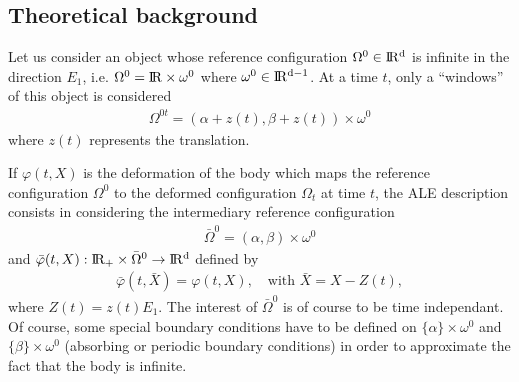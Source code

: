 \documentclass[a4paper,11pt,english]{sphinxmanual}
\begin{document}
\subsection{Theoretical background}
\label{\detokenize{userdoc/model_ALE_rotating:id3}}
Let us consider an object whose reference configuration \(\Omega^0 \in \rm I\hspace{-0.15em}R^{d}\) is infinite in the direction \(E_1\), i.e. \(\Omega^0 = \rm I\hspace{-0.15em}R \times \omega^0\) where \(\omega^0 \in \rm I\hspace{-0.15em}R^{d-1}\). At a time \(t\), only a “windows” of this object is considered
\begin{equation*}
\begin{split}\Omega^{0t} = (\alpha + z(t), \beta + z(t)) \times \omega^0\end{split}
\end{equation*}
where \(z(t)\) represents the translation.

If \(\varphi(t, X)\) is the deformation of the body which maps the reference configuration \(\Omega^0\) to the deformed configuration \(\Omega_t\) at time \(t\), the ALE description consists in considering the intermediary reference configuration
\begin{equation*}
\begin{split}\bar{\Omega}^{0} = (\alpha, \beta) \times \omega^0\end{split}
\end{equation*}
and \(\bar{\varphi}(t, X) : \rm I\hspace{-0.15em}R_+ \times \bar{\Omega}^{0} \rightarrow \rm I\hspace{-0.15em}R^d\) defined by
\begin{equation*}
\begin{split}\bar{\varphi}(t,\bar{X}) = \varphi(t,X), ~~~\mbox{ with } \bar{X} = X - Z(t),\end{split}
\end{equation*}
where \(Z(t) = z(t)E_1\). The interest of \(\bar{\Omega}^{0}\) is of course to be time independant. Of course, some special boundary conditions have to be defined on \(\{\alpha\} \times \omega^0\) and \(\{\beta\} \times \omega^0\) (absorbing or periodic boundary conditions) in order to approximate the fact that the body is infinite.

\begin{figure}[htbp]
\centering

\noindent{}
\end{figure}
\end{document}
